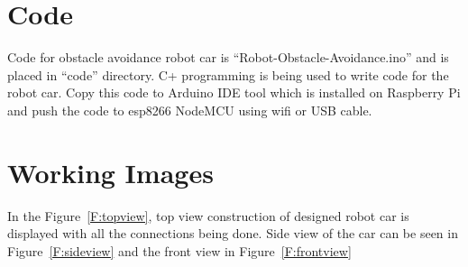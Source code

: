 \section{Code}
Code for obstacle avoidance robot car is ``Robot-Obstacle-Avoidance.ino'' 
and is placed in ``code'' directory. C+ programming is being used to write 
code for the robot car. Copy this code to Arduino IDE tool which is 
installed on Raspberry Pi and push the code to esp8266 NodeMCU using wifi or 
USB cable.

\section{Working Images}
In the Figure~\ref{F:topview}, top view construction of designed robot car 
is displayed with all the connections being done. Side view of the car can 
be seen in Figure~\ref{F:sideview} and the front view in 
Figure~\ref{F:frontview}
